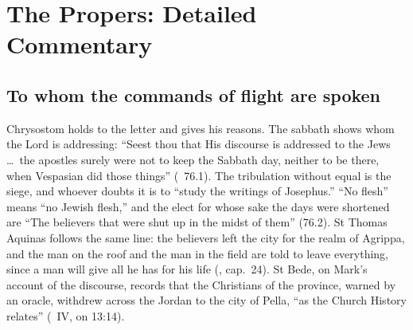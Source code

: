 
\section{The Propers: Detailed Commentary}

\subsection{To whom the commands of flight are spoken}

Chrysostom holds to the letter and gives his reasons. The sabbath shows whom
the Lord is addressing: ``Seest thou that His discourse is addressed to the
Jews \dots\ the apostles surely were not to keep the Sabbath day, neither to
be there, when Vespasian did those things'' (~76.1). The
tribulation without equal is the siege, and whoever doubts it is to ``study
the writings of Josephus.'' ``No flesh'' means ``no Jewish flesh,'' and the
elect for whose sake the days were shortened are ``The believers that were
shut up in the midst of them'' (76.2). St Thomas Aquinas follows the same
line: the believers left the city for the realm of Agrippa, and the man on
the roof and the man in the field are told to leave everything, since a man
will give all he has for his life (, cap.~24). St Bede,
on Mark's account of the discourse, records that the Christians of the
province, warned by an oracle, withdrew across the Jordan to the city of
Pella, ``as the Church History relates'' (~IV, on 13:14).

